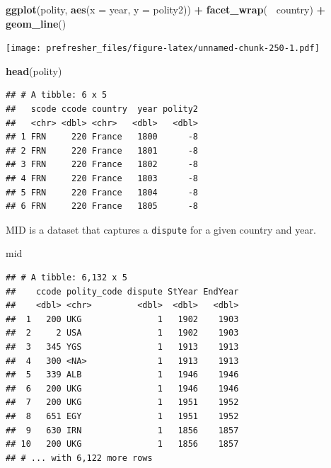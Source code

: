 \documentclass[]{book}
\newenvironment{Shaded}{\begin{snugshade}}{\end{snugshade}}
\newcommand{\DataTypeTok}[1]{\textcolor[rgb]{0.13,0.29,0.53}{#1}}
\newcommand{\KeywordTok}[1]{\textcolor[rgb]{0.13,0.29,0.53}{\textbf{#1}}}
\newcommand{\NormalTok}[1]{#1}
\newcommand{\OperatorTok}[1]{\textcolor[rgb]{0.81,0.36,0.00}{\textbf{#1}}}
\newcommand{\StringTok}[1]{\textcolor[rgb]{0.31,0.60,0.02}{#1}}
\theoremstyle{definition}
\theoremstyle{definition}
\theoremstyle{definition}
\theoremstyle{remark}
\begin{document}
\begin{Shaded}
\begin{Highlighting}[]
\KeywordTok{ggplot}\NormalTok{(polity, }\KeywordTok{aes}\NormalTok{(}\DataTypeTok{x =}\NormalTok{ year, }\DataTypeTok{y =}\NormalTok{ polity2)) }\OperatorTok{+}
\StringTok{  }\KeywordTok{facet_wrap}\NormalTok{(}\OperatorTok{~}\StringTok{ }\NormalTok{country) }\OperatorTok{+}
\StringTok{  }\KeywordTok{geom_line}\NormalTok{()}
\end{Highlighting}
\end{Shaded}

\texttt{[image: prefresher\_files/figure-latex/unnamed-chunk-250-1.pdf]}

\begin{Shaded}
\begin{Highlighting}[]
\KeywordTok{head}\NormalTok{(polity)}
\end{Highlighting}
\end{Shaded}

\begin{verbatim}
## # A tibble: 6 x 5
##   scode ccode country  year polity2
##   <chr> <dbl> <chr>   <dbl>   <dbl>
## 1 FRN     220 France   1800      -8
## 2 FRN     220 France   1801      -8
## 3 FRN     220 France   1802      -8
## 4 FRN     220 France   1803      -8
## 5 FRN     220 France   1804      -8
## 6 FRN     220 France   1805      -8
\end{verbatim}

MID is a dataset that captures a \texttt{dispute} for a given country and year.

\begin{Shaded}
\begin{Highlighting}[]
\NormalTok{mid}
\end{Highlighting}
\end{Shaded}

\begin{verbatim}
## # A tibble: 6,132 x 5
##    ccode polity_code dispute StYear EndYear
##    <dbl> <chr>         <dbl>  <dbl>   <dbl>
##  1   200 UKG               1   1902    1903
##  2     2 USA               1   1902    1903
##  3   345 YGS               1   1913    1913
##  4   300 <NA>              1   1913    1913
##  5   339 ALB               1   1946    1946
##  6   200 UKG               1   1946    1946
##  7   200 UKG               1   1951    1952
##  8   651 EGY               1   1951    1952
##  9   630 IRN               1   1856    1857
## 10   200 UKG               1   1856    1857
## # ... with 6,122 more rows
\end{verbatim}
\end{document}
